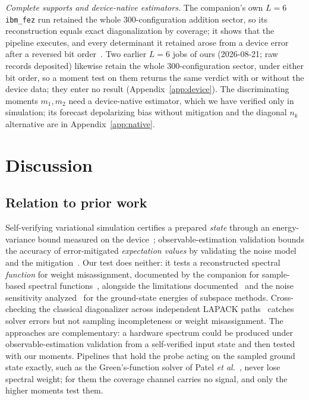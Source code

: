 \documentclass[submission, PhysCore]{SciPost}
\begin{document}
\emph{Complete supports and device-native estimators.} The companion's own $L=6$ \texttt{ibm\_fez} run retained the whole $300$-configuration addition sector, so its reconstruction equals exact diagonalization by coverage; it shows that the pipeline executes, and every determinant it retained arose from a device error after a reversed bit order~\cite{SQDspec2608}. Two earlier $L=6$ jobs of ours (2026-08-21; raw records deposited) likewise retain the whole $300$-configuration sector, under either bit order, so a moment test on them returns the same verdict with or without the device data; they enter no result (Appendix~\ref{app:device}). The discriminating moments $m_1,m_2$ need a device-native estimator, which we have verified only in simulation; its forecast depolarizing bias without mitigation and the diagonal $n_k$ alternative are in Appendix~\ref{app:native}.

\FloatBarrier
\section{Discussion}\label{sec:limits}
\label{sec:stack-main}

\subsection{Relation to prior work}
\label{sec:related}
Self-verifying variational simulation certifies a prepared \emph{state} through an energy-variance bound measured on the device~\cite{Kokail2019}; observable-estimation validation bounds the accuracy of error-mitigated \emph{expectation values} by validating the noise model and the mitigation~\cite{OEACV2026}. Our test does neither: it tests a reconstructed spectral \emph{function} for weight misassignment, documented by the companion for sample-based spectral functions~\cite{SQDspec2608}, alongside the limitations documented~\cite{Reinholdt2025,GaberleJattana2026,VaqueroSabater2026} and the noise sensitivity analyzed~\cite{Epperly2022,Kirby2024} for the ground-state energies of subspace methods. Cross-checking the classical diagonalizer across independent LAPACK paths~\cite{CertifyED2026} catches solver errors but not sampling incompleteness or weight misassignment. The approaches are complementary: a hardware spectrum could be produced under observable-estimation validation from a self-verified input state and then tested with our moments. Pipelines that hold the probe acting on the sampled ground state exactly, such as the Green's-function solver of Patel \emph{et al.}~\cite{Patel2026}, never lose spectral weight; for them the coverage channel carries no signal, and only the higher moments test them.
\end{document}
